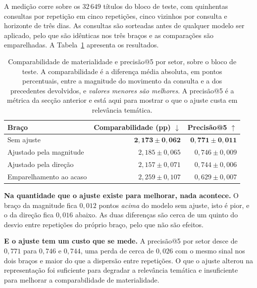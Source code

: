 A medição corre sobre os $32\,649$ títulos do bloco de teste, com quinhentas consultas por
repetição em cinco repetições, cinco vizinhos por consulta e horizonte de três dias. As consultas
são sorteadas antes de qualquer modelo ser aplicado, pelo que são idênticas nos três braços e as
comparações são emparelhadas. A Tabela~\ref{tab:av_qi4_resultado} apresenta os resultados.

\begin{table}[htbp]
\centering
\small
\caption[Resultado do ajuste por materialidade comparável]{Comparabilidade de materialidade e
precisão@5 por setor, sobre o bloco de teste. A comparabilidade é a diferença média absoluta, em
pontos percentuais, entre a magnitude do movimento da consulta e a dos precedentes devolvidos, e
\emph{valores menores são melhores}. A precisão@5 é a métrica da secção anterior e está aqui para
mostrar o que o ajuste custa em relevância temática.}
\label{tab:av_qi4_resultado}
\begin{tabular}{lrr}
\toprule
Braço & Comparabilidade (pp) $\downarrow$ & Precisão@5 $\uparrow$ \\
\midrule
Sem ajuste                & $\mathbf{2{,}173 \pm 0{,}062}$ & $\mathbf{0{,}771 \pm 0{,}011}$ \\
Ajustado pela magnitude   & $2{,}185 \pm 0{,}065$          & $0{,}746 \pm 0{,}009$ \\
Ajustado pela direção     & $2{,}157 \pm 0{,}071$          & $0{,}744 \pm 0{,}006$ \\
Emparelhamento ao acaso   & $2{,}259 \pm 0{,}107$          & $0{,}629 \pm 0{,}007$ \\
\bottomrule
\end{tabular}
\end{table}

\textbf{Na quantidade que o ajuste existe para melhorar, nada acontece.} O braço da magnitude
fica $0{,}012$ pontos \emph{acima} do modelo sem ajuste, isto é pior, e o da direção fica
$0{,}016$ abaixo. As duas diferenças são cerca de um quinto do desvio entre repetições do próprio
braço, pelo que não são efeitos.

\textbf{E o ajuste tem um custo que se mede.} A precisão@5 por setor desce de $0{,}771$ para
$0{,}746$ e $0{,}744$, uma perda de cerca de $0{,}026$ com o mesmo sinal nos dois braços e maior
do que a dispersão entre repetições. O que o ajuste alterou na representação foi suficiente para
degradar a relevância temática e insuficiente para melhorar a comparabilidade de materialidade.

